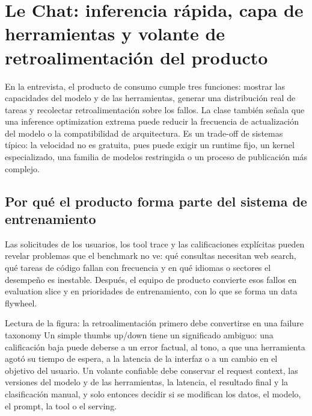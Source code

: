 \section{Le Chat: inferencia rápida, capa de herramientas y volante de retroalimentación del producto}

En la entrevista, el producto de consumo cumple tres funciones: mostrar las capacidades del modelo y de las herramientas, generar una distribución real de tareas y recolectar retroalimentación sobre los fallos. La clase también señala que una inference optimization extrema puede reducir la frecuencia de actualización del modelo o la compatibilidad de arquitectura. Es un trade-off de sistemas típico: la velocidad no es gratuita, pues puede exigir un runtime fijo, un kernel especializado, una familia de modelos restringida o un proceso de publicación más complejo.

\subsection{Por qué el producto forma parte del sistema de entrenamiento}

Las solicitudes de los usuarios, los tool trace y las calificaciones explícitas pueden revelar problemas que el benchmark no ve: qué consultas necesitan web search, qué tareas de código fallan con frecuencia y en qué idiomas o sectores el desempeño es inestable. Después, el equipo de producto convierte esos fallos en evaluation slice y en prioridades de entrenamiento, con lo que se forma un data flywheel.


\begin{knowledgebox}{Lectura de la figura: la retroalimentación primero debe convertirse en una failure taxonomy}
Un simple thumbs up/down tiene un significado ambiguo: una calificación baja puede deberse a un error factual, al tono, a que una herramienta agotó su tiempo de espera, a la latencia de la interfaz o a un cambio en el objetivo del usuario. Un volante confiable debe conservar el request context, las versiones del modelo y de las herramientas, la latencia, el resultado final y la clasificación manual, y solo entonces decidir si se modifican los datos, el modelo, el prompt, la tool o el serving.
\end{knowledgebox}

